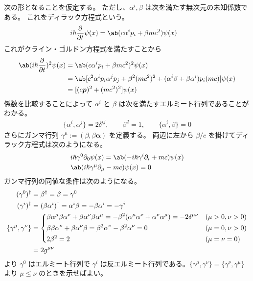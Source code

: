 \documentclass[uplatex,dvipdfmx,a4paper,11pt]{jlreq}
\newcommand{\pp}{\bm{p}}
\numberwithin{equation}{section}
\theoremstyle{definition}
\begin{document}
次の形となることを仮定する。
ただし、$\alpha^i, \beta$ は次を満たす無次元の未知係数である。
これをディラック方程式という。
\begin{align}
  i\hbar\diffp{}{t}\psi(x) & = \ab(c\alpha^ip_i + \beta mc^2)\psi(x)
\end{align}
これがクライン・ゴルドン方程式を満たすことから
\begin{align}
  \ab(i\hbar\diffp{}{t})^2\psi(x) & = \ab(c\alpha^ip_i + \beta mc^2)^2\psi(x)                                                          \\
                                  & = \ab[c^2\alpha^ip_i\alpha^jp_j + \beta^2(mc^2)^2 + (\alpha^i\beta + \beta\alpha^i)p_i(mc)]\psi(x) \\
                                  & = [(c\pp)^2 + (mc^2)^2]\psi(x)
\end{align}
係数を比較することによって $\alpha^i$ と $\beta$ は次を満たすエルミート行列であることがわかる。
\begin{align}
  \lbrace\alpha^i,\alpha^j\rbrace = 2\delta^{ij}, \qquad \beta^2 = 1, \qquad \lbrace\alpha^i,\beta\rbrace = 0 \label{condition}
\end{align}
さらにガンマ行列 $\gamma^\mu := (\beta, \beta\bm{\alpha})$ を定義する。
両辺に左から $\beta/c$ を掛けてディラック方程式は次のようになる。
\begin{align}
   & i\hbar\gamma^0\partial_0\psi(x) = \ab(-i\hbar\gamma^i\partial_i + mc)\psi(x) \\
   & \ab(i\hbar\gamma^\mu\partial_\mu - mc)\psi(x) = 0
\end{align}
ガンマ行列の同値な条件は次のようになる。
\begin{align}
  (\gamma^0)^\dagger                   & = \beta^\dagger = \beta = \gamma^0                                                                                        \\
  (\gamma^i)^\dagger                   & = (\beta\alpha^i)^\dagger = \alpha^i\beta = -\beta\alpha^i = -\gamma^i                                                    \\
  \lbrace\gamma^\mu, \gamma^\nu\rbrace & =
  \begin{dcases}
    \beta\alpha^\mu\beta\alpha^\nu + \beta\alpha^\nu\beta\alpha^\mu = -\beta^2(\alpha^\mu\alpha^\nu + \alpha^\nu\alpha^\mu) = -2\delta^{\mu\nu} & (\mu > 0, \nu > 0) \\
    \beta\beta\alpha^\nu + \beta\alpha^\nu\beta = \beta^2\alpha^\nu - \beta^2\alpha^\nu = 0                                                     & (\mu = 0, \nu > 0) \\
    2\beta^2 = 2                                                                                                                                & (\mu = \nu = 0)
  \end{dcases} \\
                                       & = 2g^{\mu\nu}
\end{align}
より $\gamma^0$ はエルミート行列で $\gamma^i$ は反エルミート行列である。$\lbrace\gamma^\mu, \gamma^\nu\rbrace = \lbrace\gamma^\nu, \gamma^\mu\rbrace$ より $\mu \leq \nu$ のときを示せばよい。
\end{document}
